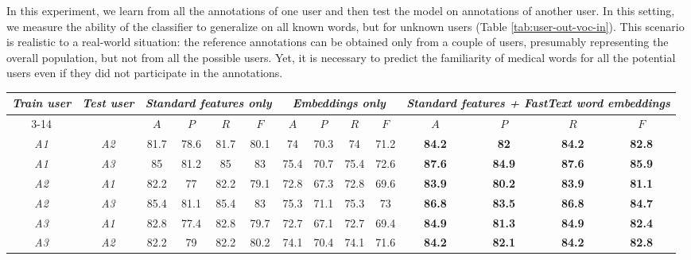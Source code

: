 In this experiment, we learn from all the annotations of one user and then test the model on annotations of another user. In this setting, we measure the ability of the classifier to generalize on all known words, but for unknown users (Table \ref{tab:user-out-voc-in}). This scenario is realistic to a real-world situation: the reference annotations can be obtained only from a couple of users, presumably representing the overall population, but not from all the possible users. Yet, it is necessary to predict the familiarity of medical words for all the potential users even if they
did not participate in the annotations.

\begin{table*}[h]
\begin{tabular}{cc|cccc|cccc|cccc}
\multirow{2}{0.6cm}{\textit{Train user}} & \multirow{2}{0.6cm}{\textit{Test user}} & \multicolumn{4}{c|}{\textit{Standard features only}} & \multicolumn{4}{c|}{\textit{Embeddings only}} & \multicolumn{4}{X}{\textit{Standard features + FastText word embeddings}} \\ \cline{3-14} 
 &  & $A$ & $P$ & $R$ & $F$ & $A$ & $P$ & $R$ & $F$ & $A$ & $P$ & $R$ & $F$ \\ \hline
\textit{A1} & \textit{A2} & 81.7 & 78.6 & 81.7 & 80.1 & 74 & 70.3 & 74 & 71.2 & \textbf{84.2} & \textbf{82} & \textbf{84.2} & \textbf{82.8} \\  
\textit{A1} & \textit{A3} & 85 & 81.2 & 85 & 83 & 75.4 & 70.7 & 75.4 & 72.6 & \textbf{87.6} & \textbf{84.9} & \textbf{87.6} & \textbf{85.9} \\ \hline 
\textit{A2} & \textit{A1} & 82.2 & 77 & 82.2 & 79.1 & 72.8 & 67.3 & 72.8 & 69.6 & \textbf{83.9} & \textbf{80.2} & \textbf{83.9} & \textbf{81.1} \\  
\textit{A2} & \textit{A3} & 85.4 & 81.1 & 85.4 & 83 & 75.3 & 71.1 & 75.3 & 73 & \textbf{86.8} & \textbf{83.5} & \textbf{86.8} & \textbf{84.7} \\ \hline 
\textit{A3} & \textit{A1} & 82.8 & 77.4 & 82.8 & 79.7 & 72.7 & 67.1 & 72.7 & 69.4 & \textbf{84.9} & \textbf{81.3} & \textbf{84.9} & \textbf{82.4} \\  
\textit{A3} & \textit{A2} & 82.2 & 79 & 82.2 & 80.2 & 74.1 & 70.4 & 74.1 & 71.6 & \textbf{84.2} & \textbf{82.1} & \textbf{84.2} & \textbf{82.8} \\ \hline 
\end{tabular}
    \caption{Experiments on user-out vocabulary-in cross-validation}
    \label{tab:user-out-voc-in}
\end{table*}


